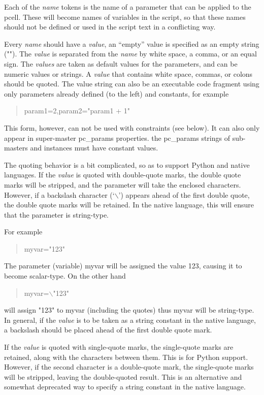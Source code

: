 \begin{description}
Each of the {\it name} tokens is the name of a parameter that can be
applied to the pcell.  These will become names of variables in the
script, so that these names should not be defined or used in the
script text in a conflicting way.

Every {\it name} should have a {\it value}, an ``empty'' value is
specified as an empty string ({\vt ""}).  The {\it value} is separated
from the {\it name} by white space, a comma, or an equal sign.  The
{\it values} are taken as default values for the parameters, and can
be numeric values or strings.  A {\it value} that contains white
space, commas, or colons should be quoted.  The value string can also
be an executable code fragment using only parameters already defined
(to the left) and constants, for example

\begin{quote} \vt
param1=2,param2="param1 + 1"
\end{quote}

This form, however, can not be used with constraints (see below).  It
can also only appear in super-master {\et pc\_params} properties.  the
{\et pc\_params} strings of sub-masters and instances must have
constant values.

The quoting behavior is a bit complicated, so as to support Python and
native languages.  If the {\it value} is quoted with double-quote
marks, the double quote marks will be stripped, and the parameter will
take the enclosed characters.  However, if a backslash character
(`$\backslash$') appears ahead of the first double quote, the double
quote marks will be retained.  In the native language, this will
ensure that the parameter is string-type.

For example
\begin{quote} \vt
myvar="123"
\end{quote}
The parameter (variable) {\vt myvar} will be assigned the value 123,
causing it to become scalar-type.  On the other hand
\begin{quote} \vt
myvar=$\backslash$"123"
\end{quote}
will assign {\vt "123"} to {\vt myvar} (including the quotes) thus
{\vt myvar} will be string-type.  In general, if the {\it value} is to
be taken as a string constant in the native language, a backslash
should be placed ahead of the first double quote mark.

If the {\it value} is quoted with single-quote marks, the single-quote
marks are retained, along with the characters between them.  This is
for Python support.  However, if the second character is a
double-quote mark, the single-quote marks will be stripped, leaving
the double-quoted result.  This is an alternative and somewhat
deprecated way to specify a string constant in the native language.


\end{description}
